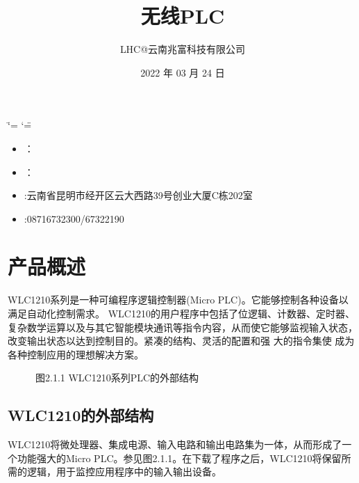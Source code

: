 \documentclass[a4paper,10pt,english]{sphinxmanual}
\title{无线PLC}
\date{2022 年 03 月 24 日}
\author{LHC@云南兆富科技有限公司}
\begin{document}
\ifdefined\shorthandoff
  \ifnum\catcode`\=\string=\active\shorthandoff{=}\fi
  \ifnum\catcode`\"=\active{}\fi
\fi

\pagestyle{empty}
\sphinxmaketitle
\pagestyle{plain}
\sphinxtableofcontents
\pagestyle{normal}
\label{\detokenize{index::doc}}


\begin{figure}[htbp]
\centering

\noindent{}
\end{figure}
\begin{itemize}
\item {} 
\sphinxAtStartPar
{}：

\item {} 
\sphinxAtStartPar
{}：

\item {} 
\sphinxAtStartPar
{}:云南省昆明市经开区云大西路39号创业大厦C栋202室

\item {} 
\sphinxAtStartPar
{}:0871\sphinxhyphen{}6732300/67322190

\end{itemize}


\chapter{产品概述}
\label{\detokenize{Product_Overview:id1}}\label{\detokenize{Product_Overview::doc}}
\sphinxAtStartPar
WLC\sphinxhyphen{}1210系列是一种可编程序逻辑控制器(Micro PLC)。它能够控制各种设备以满足自动化控制需求。
WLC\sphinxhyphen{}1210的用户程序中包括了位逻辑、计数器、定时器、复杂数学运算以及与其它智能模块通讯等指令内容，从而使它能够监视输入状态，改变输出状态以达到控制目的。紧凑的结构、灵活的配置和强 大的指令集使  成为各种控制应用的理想解决方案。

\begin{figure}[htbp]
\centering
\capstart

\noindent{}
\caption{图2.1.1  WLC\sphinxhyphen{}1210系列PLC的外部结构}\label{\detokenize{Product_Overview:id4}}\end{figure}


\section{WLC\sphinxhyphen{}1210的外部结构}
\label{\detokenize{Product_Overview:wlc-1210}}
\sphinxAtStartPar
WLC\sphinxhyphen{}1210将微处理器、集成电源、输入电路和输出电路集为一体，从而形成了一个功能强大的Micro PLC。参见图2.1.1。在下载了程序之后，WLC\sphinxhyphen{}1210将保留所需的逻辑，用于监控应用程序中的输入输出设备。
\end{document}
